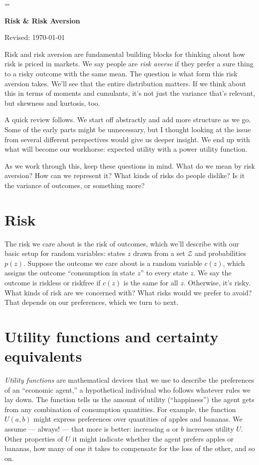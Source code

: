 \documentclass[11pt]{article}
\begin{document}
\parskip=\bigskipamount
\parindent=0.0in
\thispagestyle{empty}


\bigskip\bigskip
\centerline{\Large \bf Risk \& Risk Aversion}
\centerline{Revised: \today}

\medskip
Risk and risk aversion are fundamental building blocks
for thinking about how risk is priced in markets.
We say people are {\it risk averse\/} if they
prefer a sure thing to a risky outcome with the same mean.
The question is what form this risk aversion takes.
We'll see that the entire distribution matters.
If we think about this in terms of moments and cumulants,
it's not just the variance that's relevant,
but skewness and kurtosis, too.

A quick review follows.
We start off abstractly and add more structure as we go.
Some of the early parts might be unnecessary,
but I thought looking at the issue from several different
perspectives would give us deeper insight.
We end up with what will become our workhorse:
expected utility with a power utility function.

As we work through this, keep these questions in mind.
What do we mean by risk aversion?
How can we represent it?
What kinds of risks do people dislike?
Is it the variance of outcomes, or something more?


\section{Risk}

The risk we care about is the risk of outcomes,
which we'll describe with our basic setup for random variables:
states $z$ drawn from a set $\mathcal{Z}$ and probabilities $p(z)$.
Suppose the outcome we care about is a random variable $c(z)$,
which assigns the outcome ``consumption in state $z$''
to every state $z$.
We say the outcome is riskless or riskfree if $c(z)$ is
the same for all $z$.
Otherwise, it's risky.
What kinds of risk are we concerned with?
What risks would we prefer to avoid?
That depends on our preferences, which we turn to next.


\section{Utility functions and certainty equivalents}

{\it Utility functions\/} are mathematical devices that we use
to describe the preferences of an ``economic agent,''
a hypothetical individual who follows whatever rules we lay down.
The function tells us the amount of utility (``happiness'')
the agent gets from any combination of consumption quantities.
For example, the function $U(a,b)$ might express preferences
over quantities of apples and bananas.
We assume --- always! --- that more is better:
increasing $a$ or $b$ increases utility $U$.
Other properties of $U$ it might indicate
whether the agent prefers apples or bananas,
how many of one it takes to compensate for the loss of the other,
and so on.
\end{document}
